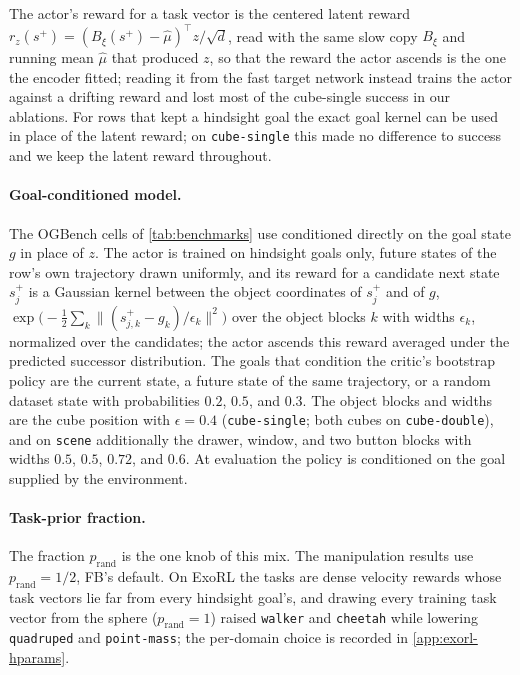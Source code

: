 The actor's reward for a task vector is the centered latent reward $r_z(s^+)=(B_\xi(s^+)-\hat\mu)^\top z/\sqrt d$, read with the same slow copy $B_\xi$ and running mean $\hat\mu$ that produced $z$, so that the reward the actor ascends is the one the encoder fitted; reading it from the fast target network instead trains the actor against a drifting reward and lost most of the cube-single success in our ablations.
For rows that kept a hindsight goal the exact goal kernel can be used in place of the latent reward; on \texttt{cube-single} this made no difference to success and we keep the latent reward throughout.

\paragraph{Goal-conditioned model.}
The OGBench cells of \cref{tab:benchmarks} use \name{} conditioned directly on the goal state $g$ in place of $z$.
The actor is trained on hindsight goals only, future states of the row's own trajectory drawn uniformly, and its reward for a candidate next state $s_j^+$ is a Gaussian kernel between the object coordinates of $s_j^+$ and of $g$, $\exp\bigl(-\tfrac12\sum_k\|(s^+_{j,k}-g_k)/\epsilon_k\|^2\bigr)$ over the object blocks $k$ with widths $\epsilon_k$, normalized over the candidates; the actor ascends this reward averaged under the predicted successor distribution.
The goals that condition the critic's bootstrap policy are the current state, a future state of the same trajectory, or a random dataset state with probabilities $0.2$, $0.5$, and $0.3$.
The object blocks and widths are the cube position with $\epsilon=0.4$ (\texttt{cube-single}; both cubes on \texttt{cube-double}), and on \texttt{scene} additionally the drawer, window, and two button blocks with widths $0.5$, $0.5$, $0.72$, and $0.6$.
At evaluation the policy is conditioned on the goal supplied by the environment.

\paragraph{Task-prior fraction.}
The fraction $p_{\mathrm{rand}}$ is the one knob of this mix.
The manipulation results use $p_{\mathrm{rand}}=1/2$, FB's default.
On ExoRL the tasks are dense velocity rewards whose task vectors lie far from every hindsight goal's, and drawing every training task vector from the sphere ($p_{\mathrm{rand}}=1$) raised \texttt{walker} and \texttt{cheetah} while lowering \texttt{quadruped} and \texttt{point-mass}; the per-domain choice is recorded in \cref{app:exorl-hparams}.

